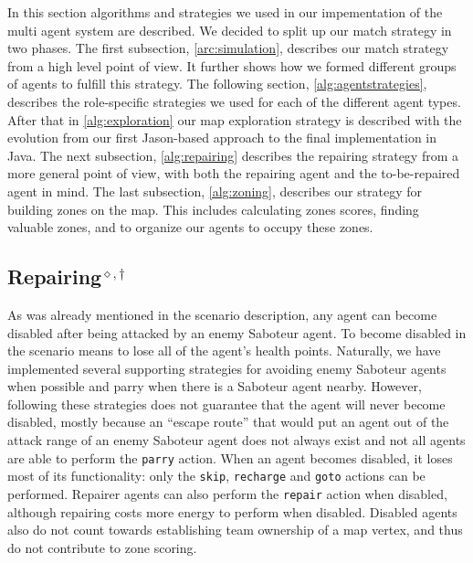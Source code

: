 In this section algorithms and strategies we used in our impementation of the multi agent system are described.
We decided to split up our match strategy in two phases.
The first subsection, \autoref{arc:simulation}, describes our match strategy from a high level point of view.
It further shows how we formed different groups of agents to fulfill this strategy.
The following section, \autoref{alg:agentstrategies}, describes the role-specific strategies we used for each of the different agent types.
After that in \autoref{alg:exploration} our map exploration strategy is described with the evolution from our first Jason-based approach to the final implementation in Java.
The next subsection, \autoref{alg:repairing} describes the repairing strategy from a more general point of view, with both the repairing agent and the to-be-repaired agent in mind.
The last subsection, \autoref{alg:zoning}, describes our strategy for building zones on the map.
This includes calculating zones scores, finding valuable zones, and to organize our agents to occupy these zones.





\subsection[Repairing]{Repairing$^{\diamond,\dagger}$}\label{alg:repairing}
As was already mentioned in the scenario description, any agent can become disabled after being attacked by an enemy Saboteur agent.
To become disabled in the scenario means to lose all of the agent's health points.
Naturally, we have implemented several supporting strategies for avoiding enemy Saboteur agents when possible and parry when there is a Saboteur agent nearby.
However, following these strategies does not guarantee that the agent will never become disabled, mostly because an \enquote{escape route} that would put an agent out of the attack range of an enemy Saboteur agent does not always exist and not all agents are able to perform the \texttt{parry} action.
When an agent becomes disabled, it loses most of its functionality: only the \texttt{skip}, \texttt{recharge} and \texttt{goto} actions can be performed.
Repairer agents can also perform the \texttt{repair} action when disabled, although repairing costs more energy to perform when disabled.
Disabled agents also do not count towards establishing team ownership of a map vertex, and thus do not contribute to zone scoring.

